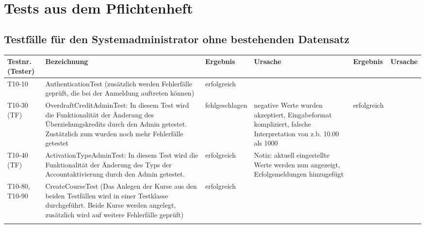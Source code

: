 \chapter{Tests aus dem Pflichtenheft}

\begin{landscape}
	\section{Testfälle für den Systemadministrator ohne bestehenden Datensatz}	
		\begin{tabular}{|p{2.0cm} |p{5.0cm}|p{3.0cm}|p{5.0cm}|p{4.0cm}|p{4.0cm}|}
			\hline \textbf{Testnr. (Tester)} & \textbf{Bezeichnung} & \textbf{Ergebnis} & \textbf{Ursache} & \textbf{Ergebnis} & \textbf{Ursache} \\ 
      	    \hline    T10-10   &      AuthenticationTest (zusätzlich werden Fehlerfälle geprüft, die bei der Anmeldung auftreten können)   &  erfolgreich &                  &                   &                  \\ 
      	    
      	     \hline    T10-30 (TF)  &    OverdraftCreditAdminTest: In diesem Test wird die Funktionalität der Änderung des Überziehungskredits durch den Admin getestet.
      	                             Zustätzlich zum wurden noch mehr Fehlerfälle getestet   &  fehlgeschlagen &    negative Werte wurden akzeptiert, Eingabeformat kompliziert, falsche Interpretation von z.b. 10.00 als 1000              &      erfolgreich             &                  \\ 
      	                             
      	    \hline    T10-40 (TF)   &    ActivationTypeAdminTest: In diesem Test wird die Funktionalität der Änderung des Typs der Accountaktivierung durch den Admin getestet.
      	      &  erfolgreich &  Notiz: aktuell eingestellte Werte werden nun angezeigt, Erfolgsmeldungen hinzugefügt           &                &                  \\                          
      	                             
			
			\hline T10-80, T10-90   &      CreateCourseTest  (Das Anlegen der Kurse aus den beiden Testfällen wird in einer Testklasse durchgeführt. Beide Kurse werden angelegt, zusätzlich wird auf weitere Fehlerfälle geprüft)              &      erfolgreich             &                  &                   &                  \\ 
			\hline       &          &          &        &         &       \\
			\hline 
		\end{tabular} \ \\
		\ \\

\end{landscape}
